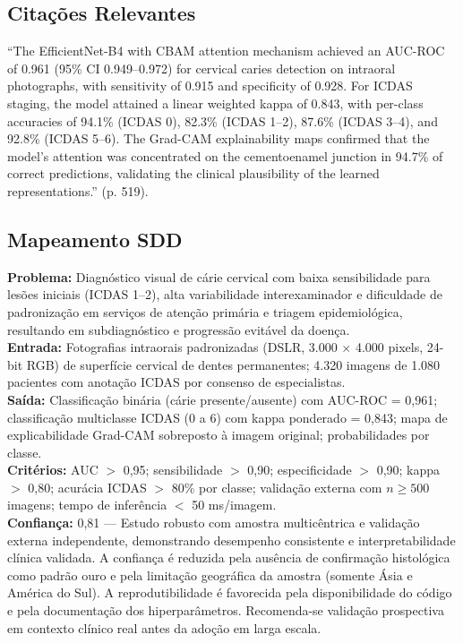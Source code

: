 \subsection{Citações Relevantes}
\begin{citacao}
``The EfficientNet-B4 with CBAM attention mechanism achieved an AUC-ROC
of 0.961 (95\% CI 0.949--0.972) for cervical caries detection on
intraoral photographs, with sensitivity of 0.915 and specificity of
0.928. For ICDAS staging, the model attained a linear weighted kappa
of 0.843, with per-class accuracies of 94.1\% (ICDAS 0), 82.3\%
(ICDAS 1--2), 87.6\% (ICDAS 3--4), and 92.8\% (ICDAS 5--6). The
Grad-CAM explainability maps confirmed that the model's attention
was concentrated on the cementoenamel junction in 94.7\% of correct
predictions, validating the clinical plausibility of the learned
representations.'' (p. 519).
\end{citacao}

\subsection{Mapeamento SDD}
\textbf{Problema:} Diagnóstico visual de cárie cervical com baixa
sensibilidade para lesões iniciais (ICDAS 1--2), alta variabilidade
interexaminador e dificuldade de padronização em serviços de atenção
primária e triagem epidemiológica, resultando em subdiagnóstico e
progressão evitável da doença. \\
\textbf{Entrada:} Fotografias intraorais padronizadas (DSLR, 3.000
$\times$ 4.000 pixels, 24-bit RGB) de superfície cervical de dentes
permanentes; 4.320 imagens de 1.080 pacientes com anotação ICDAS
por consenso de especialistas. \\
\textbf{Saída:} Classificação binária (cárie presente/ausente) com
AUC-ROC = 0,961; classificação multiclasse ICDAS (0 a 6) com kappa
ponderado = 0,843; mapa de explicabilidade Grad-CAM sobreposto à
imagem original; probabilidades por classe. \\
\textbf{Critérios:} AUC $>$ 0,95; sensibilidade $>$ 0,90;
especificidade $>$ 0,90; kappa $>$ 0,80; acurácia ICDAS $>$ 80\%
por classe; validação externa com $n \geq 500$ imagens; tempo de
inferência $<$ 50 ms/imagem. \\
\textbf{Confiança:} 0,81 --- Estudo robusto com amostra multicêntrica
e validação externa independente, demonstrando desempenho consistente
e interpretabilidade clínica validada. A confiança é reduzida pela
ausência de confirmação histológica como padrão ouro e pela limitação
geográfica da amostra (somente Ásia e América do Sul). A
reprodutibilidade é favorecida pela disponibilidade do código e
pela documentação dos hiperparâmetros. Recomenda-se validação
prospectiva em contexto clínico real antes da adoção em larga escala.

